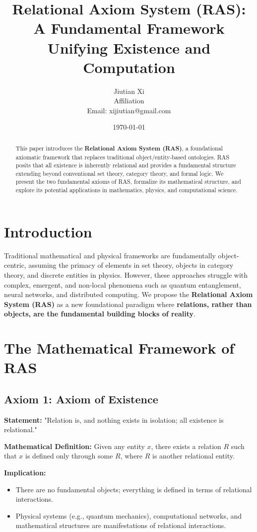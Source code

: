 \documentclass[a4paper,12pt]{article}
\title{\textbf{Relational Axiom System (RAS): A Fundamental Framework Unifying Existence and Computation}}
\author{Jiutian Xi \\ Affiliation \\ Email: xijiutian@gmail.com}
\date{\today}
\begin{document}
\maketitle

\begin{abstract}
This paper introduces the \textbf{Relational Axiom System (RAS)}, a foundational axiomatic framework that replaces traditional object/entity-based ontologies. RAS posits that all existence is inherently relational and provides a fundamental structure extending beyond conventional set theory, category theory, and formal logic. We present the two fundamental axioms of RAS, formalize its mathematical structure, and explore its potential applications in mathematics, physics, and computational science.
\end{abstract}

\section{Introduction}
Traditional mathematical and physical frameworks are fundamentally object-centric, assuming the primacy of elements in set theory, objects in category theory, and discrete entities in physics. However, these approaches struggle with complex, emergent, and non-local phenomena such as quantum entanglement, neural networks, and distributed computing. We propose the \textbf{Relational Axiom System (RAS)} as a new foundational paradigm where \textbf{relations, rather than objects, are the fundamental building blocks of reality}.

\section{The Mathematical Framework of RAS}

\subsection{Axiom 1: Axiom of Existence}
\textbf{Statement:} "Relation is, and nothing exists in isolation; all existence is relational."

\textbf{Mathematical Definition:} Given any entity \( x \), there exists a relation \( R \) such that \( x \) is defined only through some \( R \), where \( R \) is another relational entity.

\textbf{Implication:}
\begin{itemize}
    \item There are no fundamental objects; everything is defined in terms of relational interactions.
    \item Physical systems (e.g., quantum mechanics), computational networks, and mathematical structures are manifestations of relational interactions.
\end{itemize}
\end{document}

